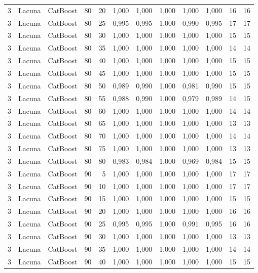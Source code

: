 \begin{longtable}{@{}rllrrrrrrrrr@{}}
3 & Lacuna & CatBoost & 80 & 20 & 1,000 & 1,000 & 1,000 & 1,000 & 1,000 & 16 & 16 \\
3 & Lacuna & CatBoost & 80 & 25 & 0,995 & 0,995 & 1,000 & 0,990 & 0,995 & 17 & 17 \\
3 & Lacuna & CatBoost & 80 & 30 & 1,000 & 1,000 & 1,000 & 1,000 & 1,000 & 15 & 15 \\
3 & Lacuna & CatBoost & 80 & 35 & 1,000 & 1,000 & 1,000 & 1,000 & 1,000 & 14 & 14 \\
3 & Lacuna & CatBoost & 80 & 40 & 1,000 & 1,000 & 1,000 & 1,000 & 1,000 & 15 & 15 \\
3 & Lacuna & CatBoost & 80 & 45 & 1,000 & 1,000 & 1,000 & 1,000 & 1,000 & 15 & 15 \\
3 & Lacuna & CatBoost & 80 & 50 & 0,989 & 0,990 & 1,000 & 0,981 & 0,990 & 15 & 15 \\
3 & Lacuna & CatBoost & 80 & 55 & 0,988 & 0,990 & 1,000 & 0,979 & 0,989 & 14 & 15 \\
3 & Lacuna & CatBoost & 80 & 60 & 1,000 & 1,000 & 1,000 & 1,000 & 1,000 & 14 & 14 \\
3 & Lacuna & CatBoost & 80 & 65 & 1,000 & 1,000 & 1,000 & 1,000 & 1,000 & 13 & 13 \\
3 & Lacuna & CatBoost & 80 & 70 & 1,000 & 1,000 & 1,000 & 1,000 & 1,000 & 14 & 14 \\
3 & Lacuna & CatBoost & 80 & 75 & 1,000 & 1,000 & 1,000 & 1,000 & 1,000 & 13 & 13 \\
3 & Lacuna & CatBoost & 80 & 80 & 0,983 & 0,984 & 1,000 & 0,969 & 0,984 & 15 & 15 \\
3 & Lacuna & CatBoost & 90 & 5 & 1,000 & 1,000 & 1,000 & 1,000 & 1,000 & 17 & 17 \\
3 & Lacuna & CatBoost & 90 & 10 & 1,000 & 1,000 & 1,000 & 1,000 & 1,000 & 17 & 17 \\
3 & Lacuna & CatBoost & 90 & 15 & 1,000 & 1,000 & 1,000 & 1,000 & 1,000 & 15 & 15 \\
3 & Lacuna & CatBoost & 90 & 20 & 1,000 & 1,000 & 1,000 & 1,000 & 1,000 & 16 & 16 \\
3 & Lacuna & CatBoost & 90 & 25 & 0,995 & 0,995 & 1,000 & 0,991 & 0,995 & 16 & 16 \\
3 & Lacuna & CatBoost & 90 & 30 & 1,000 & 1,000 & 1,000 & 1,000 & 1,000 & 13 & 13 \\
3 & Lacuna & CatBoost & 90 & 35 & 1,000 & 1,000 & 1,000 & 1,000 & 1,000 & 14 & 14 \\
3 & Lacuna & CatBoost & 90 & 40 & 1,000 & 1,000 & 1,000 & 1,000 & 1,000 & 15 & 15 \\

\end{longtable}
